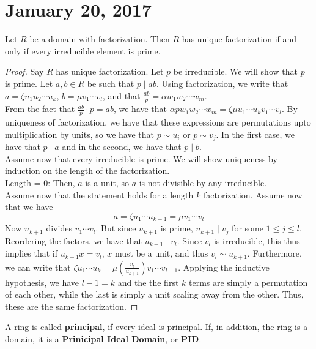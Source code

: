 \section{January 20, 2017}
\begin{prop}
    Let $R$ be a domain with factorization. Then $R$ has unique factorization if and
    only if every irreducible element is prime.
\end{prop}
\begin{proof}
    Say $R$ has unique factorization. Let $p$ be irreducible. We will show that
    $p$ is prime. Let $a,b \in R$ be such that $p \mid ab$. Using factorization,
    we write that $a = \zeta u_1u_2 \cdots u_k$, $b = \mu v_1\cdots v_l$, and that
    $\frac{ab}{p} = \alpha w_1w_2 \cdots w_m$. \\
    From the fact that $\frac{ab}{p}\cdot p = ab$, we have that $\alpha p w_1w_2\cdots w_m = \zeta\mu u_1\cdots u_kv_1 \cdots v_l$.
    By uniqueness of factorization, we have that these expressions are permutations
    upto multiplication by units, so we have that $p \sim u_i$ or $p \sim v_j$. In
    the first case, we have that $p \mid a$ and in the second, we have that $p \mid b$. \\
    Assume now that every irreducible is prime. We will show uniqueness by induction
    on the length of the factorization. \\
    Length = 0: Then, $a$ is a unit, so $a$ is not divisible by any irreducible. \\
    Assume now that the statement holds for a length $k$ factorization.
    Assume now that we have
    $$
    a = \zeta u_1 \cdots u_{k+1} = \mu v_1 \cdots v_l
    $$
    Now $u_{k+1}$ divides $v_1 \cdots v_l$. But since $u_{k+1}$ is prime, $u_{k+1} \mid v_j$
    for some $1 \leq j \leq l$. Reordering the factors, we have that
    $u_{k+1} \mid v_l$. Since $v_l$ is irreducible, this thus implies that if $u_{k+1}x = v_l$,
    $x$ must be a unit, and thus $v_l \sim u_{k+1}$. Furthermore, we can write that
    $\zeta u_1 \cdots u_k = \mu \left(\frac{v_l}{u_{k+1}}\right) v_1 \cdots v_{l-1}$. Applying
    the inductive hypothesis, we have $l -1 = k$ and the the first $k$ terms
    are simply a permutation of each other, while the last is simply a unit scaling
    away from the other. Thus, these are the same factorization.
\end{proof}
\begin{defn}
    A ring is called \textbf{principal}, if every ideal is principal. If,
    in addition, the ring is a domain, it is a \textbf{Prinicipal Ideal Domain}, or
    \textbf{PID}.
\end{defn}
